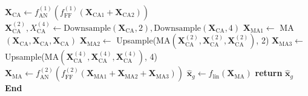 \begin{algorithm}
\begin{algorithmic}[1]
\vspace{0.5em}
\State \hspace{0.2cm} $\mathbf{X}_\text{CA}\gets f_{\text{AN}}^{(1)}\left(f_{\text{FF}}^{(1)}\left(\mathbf{X}_\text{CA1}+\mathbf{X}_\text{CA2}\right)\right)$
\vspace{0.5em}
\State \hspace{0.2cm}  $\mathbf{X}^{(2)}_{\text{CA}}, X^{(4)}_{\text{CA}} \gets \text{Downsample}(\mathbf{X}_{\text{CA}}, 2), \text{Downsample}(\mathbf{X}_{\text{CA}}, 4)$
\vspace{0.5em}
\State \hspace{0.2cm} $\mathbf{X}_{\text{MA1}}\gets$ MA$(\mathbf{X}_{\text{CA}}, \mathbf{X}_{\text{CA}}, \mathbf{X}_{\text{CA}})$
\vspace{0.5em}
\State \hspace{0.2cm} $\mathbf{X}_{\text{MA2}}\gets$ Upsample(MA$(\mathbf{X}^{(2)}_{\text{CA}}, \mathbf{X}^{(2)}_{\text{CA}}, \mathbf{X}^{(2)}_{\text{CA}})$, 2)
\vspace{0.5em}
\State \hspace{0.2cm} $\mathbf{X}_{\text{MA3}}\gets$ Upsample(MA$(\mathbf{X}^{(4)}_{\text{CA}}, \mathbf{X}^{(4)}_{\text{CA}}, \mathbf{X}^{(4)}_{\text{CA}})$, 4)
\vspace{0.5em}
\State \hspace{0.2cm} $\mathbf{X}_\text{MA}\gets f_{\text{AN}}^{(2)}\left(f_{\text{FF}}^{(2)}\left(\mathbf{X}_\text{MA1}+\mathbf{X}_\text{MA2}+\mathbf{X}_\text{MA3}\right)\right)$
\vspace{0.5em}
\State \hspace{0.2cm} $\hat{\mathbf{x}}_g \gets f_\text{lin}(\mathbf{X}_\text{MA})$
\vspace{0.5em}
\State \hspace{0.2cm} \textbf{return} $\hat{\mathbf{x}}_g$
\State \textbf{End}
\end{algorithmic}
\vspace{-0.8mm}
\end{algorithm}